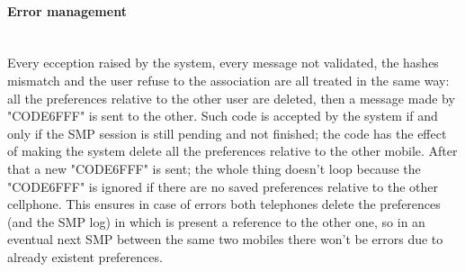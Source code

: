 \paragraph{Error management} \hspace{0pt} \\
Every ecception raised by the system, every message not validated, the hashes mismatch and the user refuse to the association are all treated in the same way: all the preferences relative to the other user are deleted, then a message made by "CODE6FFF" is sent to the other. Such code is accepted by the system if and only if the SMP session is still pending and not finished; the code has the effect of making the system delete all the preferences relative to the other mobile. After that a new "CODE6FFF" is sent; the whole thing doesn't loop because the "CODE6FFF" is ignored if there are no saved preferences relative to the other cellphone. This ensures in case of errors both telephones delete the preferences (and the SMP log) in which is present a reference to the other one, so in an eventual next SMP between the same two mobiles there won't be errors due to already existent preferences.
